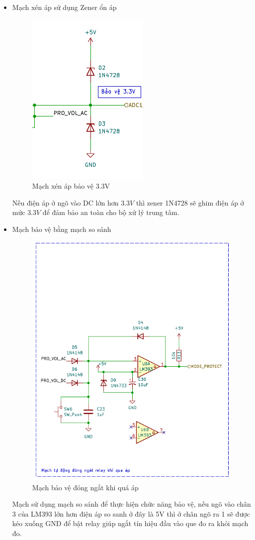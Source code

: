 	\begin{itemize}[label=-]
		\item Mạch xén áp sử dụng Zener ổn áp
	
		\begin{figure}[H]
			\centering
			\includegraphics[width=0.5\linewidth]{./picture/protect_ADC.pdf}
			\caption{Mạch xén áp bảo vệ 3.3V}
			\label{t_mach xen ap bao ve}
		\end{figure}
	
	Nếu điện áp ở ngõ vào DC lớn hơn $3.3V$ thì zener 1N4728 sẽ ghim điện áp ở mức $3.3V$ để đảm bảo an toàn cho bộ xử lý trung tâm.
	
	\item Mạch bảo vệ bằng mạch so sánh
	
	\begin{figure}[H]
		\centering
		\includegraphics[width=0.7\linewidth]{./picture/pro_compere.pdf}
		\caption{Mạch bảo vệ đóng ngắt khi quá áp}
		\label{t_mach bao ve dong ngat khi qua ap}
	\end{figure}
	
	Mạch sử dụng mạch so sánh để thực hiện chức năng bảo vệ, nếu ngõ vào chân 3 của LM393 lớn hơn điện áp so sanh ở đây là 5V thì ở chân ngõ ra 1 sẽ được kéo xuống GND để bật relay giúp ngắt tín hiệu đầu vào que đo ra khỏi mạch đo.
	\end{itemize}
	
